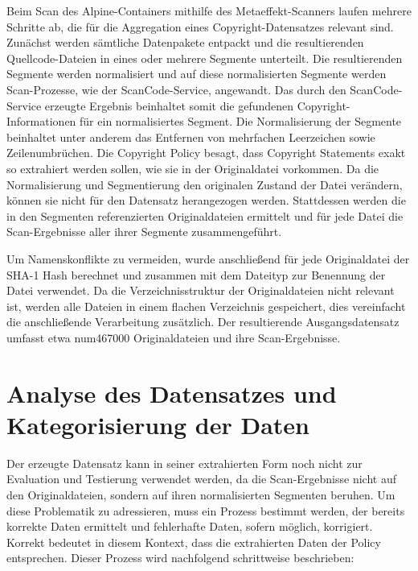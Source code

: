 Beim Scan des Alpine-Containers mithilfe des Metaeffekt-Scanners laufen mehrere Schritte ab, die für die Aggregation eines Copyright-Datensatzes relevant sind.
Zunächst werden sämtliche Datenpakete entpackt und die resultierenden Quellcode-Dateien in eines oder mehrere Segmente unterteilt.
Die resultierenden Segmente werden normalisiert und auf diese normalisierten Segmente werden Scan-Prozesse, wie der ScanCode-Service, angewandt.
Das durch den ScanCode-Service erzeugte Ergebnis beinhaltet somit die gefundenen Copyright-Informationen für ein normalisiertes Segment.
Die Normalisierung der Segmente beinhaltet unter anderem das Entfernen von mehrfachen Leerzeichen sowie Zeilenumbrüchen.
Die Copyright Policy besagt, dass Copyright Statements exakt so extrahiert werden sollen, wie sie in der Originaldatei vorkommen.
Da die Normalisierung und Segmentierung den originalen Zustand der Datei verändern, können sie nicht für den Datensatz herangezogen werden.
Stattdessen werden die in den Segmenten referenzierten Originaldateien ermittelt und für jede Datei die Scan-Ergebnisse aller ihrer Segmente zusammengeführt.

Um Namenskonflikte zu vermeiden, wurde anschließend für jede Originaldatei der SHA-1 Hash berechnet und zusammen mit dem Dateityp zur Benennung der Datei verwendet.
Da die Verzeichnisstruktur der Originaldateien nicht relevant ist, werden alle Dateien in einem flachen Verzeichnis gespeichert, dies vereinfacht die anschließende Verarbeitung zusätzlich.
Der resultierende Ausgangsdatensatz umfasst etwa num{467000} Originaldateien und ihre Scan-Ergebnisse.

\section{Analyse des Datensatzes und Kategorisierung der Daten}\label{sec:analyse-datensatz}

Der erzeugte Datensatz kann in seiner extrahierten Form noch nicht zur Evaluation und Testierung verwendet werden, da die Scan-Ergebnisse nicht auf den Originaldateien, sondern auf ihren normalisierten Segmenten beruhen.
Um diese Problematik zu adressieren, muss ein Prozess bestimmt werden, der bereits korrekte Daten ermittelt und fehlerhafte Daten, sofern möglich, korrigiert.
Korrekt bedeutet in diesem Kontext, dass die extrahierten Daten der Policy entsprechen.
Dieser Prozess wird nachfolgend schrittweise beschrieben:

